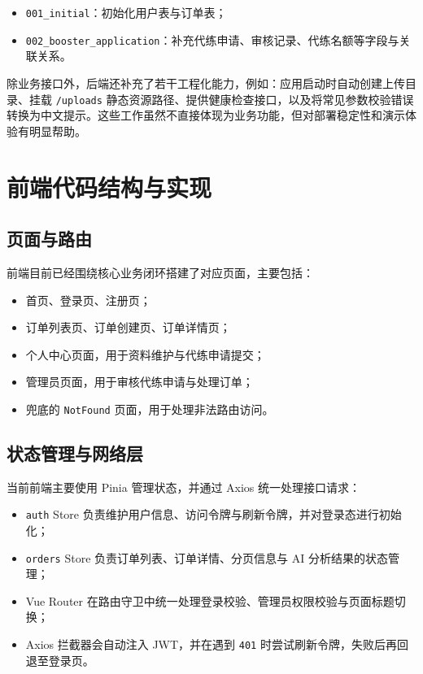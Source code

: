 ﻿\documentclass[12pt,a4paper]{ctexart}
\begin{document}
\begin{itemize}[leftmargin=2em]
  \item \texttt{001\_initial}：初始化用户表与订单表；
  \item \texttt{002\_booster\_application}：补充代练申请、审核记录、代练名额等字段与关联关系。
\end{itemize}

除业务接口外，后端还补充了若干工程化能力，例如：应用启动时自动创建上传目录、挂载 \texttt{/uploads} 静态资源路径、提供健康检查接口，以及将常见参数校验错误转换为中文提示。这些工作虽然不直接体现为业务功能，但对部署稳定性和演示体验有明显帮助。

\section{前端代码结构与实现}

\subsection{页面与路由}
前端目前已经围绕核心业务闭环搭建了对应页面，主要包括：

\begin{itemize}[leftmargin=2em]
  \item 首页、登录页、注册页；
  \item 订单列表页、订单创建页、订单详情页；
  \item 个人中心页面，用于资料维护与代练申请提交；
  \item 管理员页面，用于审核代练申请与处理订单；
  \item 兜底的 \texttt{NotFound} 页面，用于处理非法路由访问。
\end{itemize}

\subsection{状态管理与网络层}
当前前端主要使用 Pinia 管理状态，并通过 Axios 统一处理接口请求：

\begin{itemize}[leftmargin=2em]
  \item \texttt{auth} Store 负责维护用户信息、访问令牌与刷新令牌，并对登录态进行初始化；
  \item \texttt{orders} Store 负责订单列表、订单详情、分页信息与 AI 分析结果的状态管理；
  \item Vue Router 在路由守卫中统一处理登录校验、管理员权限校验与页面标题切换；
  \item Axios 拦截器会自动注入 JWT，并在遇到 \texttt{401} 时尝试刷新令牌，失败后再回退至登录页。
\end{itemize}
\end{document}
